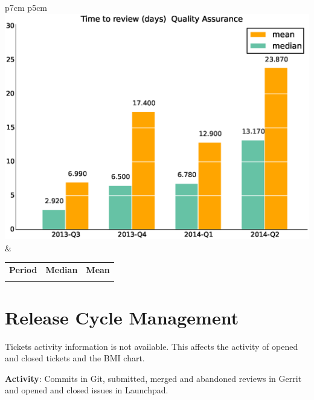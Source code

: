 \documentclass[a4wide,11pt]{report}
\begin{document}
\begin{tabular}{p{7cm} p{5cm}}
    \vspace{0pt} 
    \includegraphics[scale=.35]{figs/timetoreview_medianQualityAssurance.eps}
    & 
    \vspace{0pt}
    \begin{tabular}{l|r|r|}%
    \bfseries Period & \bfseries Median & \bfseries Mean %
    \csvreader[head to column names]{data/timetoreview_medianQualityAssurance.csv}{}%
    {\\ & \mediantime & \meantime}
    \end{tabular}
\end{tabular}


\newpage
\section{Release Cycle Management}

Tickets activity information is not available. This affects the activity of opened and closed tickets and the BMI chart.

\textbf{Activity}: Commits in Git, submitted, merged and abandoned reviews in Gerrit and opened and closed issues in Launchpad.
\end{document}
